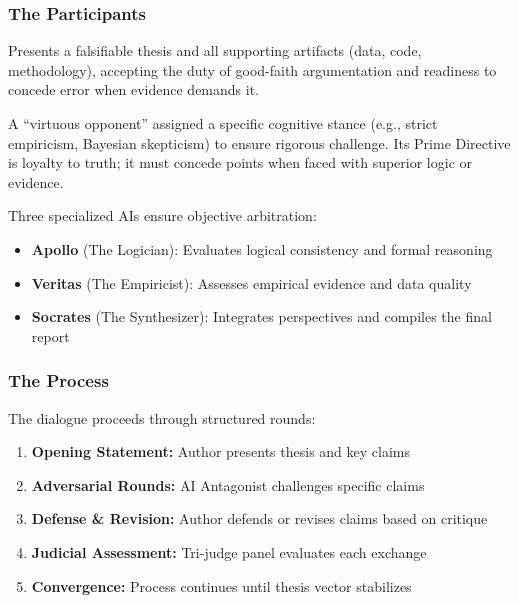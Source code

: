 \documentclass[11pt,a4paper]{article}
\begin{document}
\subsubsection{The Participants}
\begin{description}[style=nextline]
    \item[\textbf{Blue Corner (The Author)}] Presents a falsifiable thesis and all supporting artifacts (data, code, methodology), accepting the duty of good-faith argumentation and readiness to concede error when evidence demands it.
    
    \item[\textbf{Red Corner (The AI Antagonist)}] A ``virtuous opponent'' assigned a specific cognitive stance (e.g., strict empiricism, Bayesian skepticism) to ensure rigorous challenge. Its Prime Directive is loyalty to truth; it must concede points when faced with superior logic or evidence.
    
    \item[\textbf{The Judicial Panel}] Three specialized AIs ensure objective arbitration:
    \begin{itemize}[nosep]
        \item \textbf{Apollo} (The Logician): Evaluates logical consistency and formal reasoning
        \item \textbf{Veritas} (The Empiricist): Assesses empirical evidence and data quality
        \item \textbf{Socrates} (The Synthesizer): Integrates perspectives and compiles the final report
    \end{itemize}
\end{description}

\subsubsection{The Process}
The dialogue proceeds through structured rounds:
\begin{enumerate}[nosep]
    \item \textbf{Opening Statement:} Author presents thesis and key claims
    \item \textbf{Adversarial Rounds:} AI Antagonist challenges specific claims
    \item \textbf{Defense \& Revision:} Author defends or revises claims based on critique
    \item \textbf{Judicial Assessment:} Tri-judge panel evaluates each exchange
    \item \textbf{Convergence:} Process continues until thesis vector stabilizes
\end{enumerate}
\end{document}
